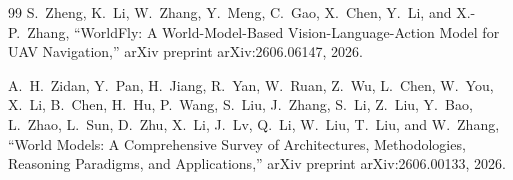 \documentclass[conference]{IEEEtran}
\begin{document}
\begin{thebibliography}{99}
S.~Zheng, K.~Li, W.~Zhang, Y.~Meng, C.~Gao, X.~Chen, Y.~Li, and
X.-P.~Zhang,
``WorldFly: A World-Model-Based Vision-Language-Action Model for UAV
Navigation,''
arXiv preprint arXiv:2606.06147, 2026.

A.~H.~Zidan, Y.~Pan, H.~Jiang, R.~Yan, W.~Ruan, Z.~Wu, L.~Chen,
W.~You, X.~Li, B.~Chen, H.~Hu, P.~Wang, S.~Liu, J.~Zhang, S.~Li,
Z.~Liu, Y.~Bao, L.~Zhao, L.~Sun, D.~Zhu, X.~Li, J.~Lv, Q.~Li,
W.~Liu, T.~Liu, and W.~Zhang,
``World Models: A Comprehensive Survey of Architectures, Methodologies,
Reasoning Paradigms, and Applications,''
arXiv preprint arXiv:2606.00133, 2026.

\end{thebibliography}
\end{document}
